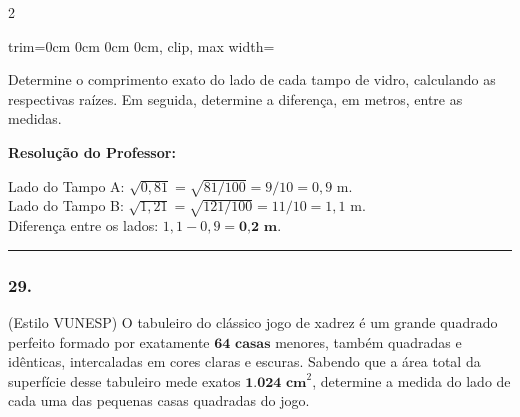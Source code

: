 \begin{multicols*}{2}
\begin{center}
\begin{adjustbox}{trim=0cm 0cm 0cm 0cm, clip, max width=\larguraTikz}
\end{adjustbox}
\end{center}
Determine o comprimento exato do lado de cada tampo de vidro, calculando as respectivas raízes. Em seguida, determine a diferença, em metros, entre as medidas.

\ifgabarito
    \begin{tcolorbox}[colback=CorTitUm!5, colframe=CorTitUm, boxrule=1pt, arc=4pt, left=6pt, right=6pt, top=6pt, bottom=6pt]
    \small\textbf{\textcolor{CorTitUm}{Resolução do Professor:}}\par\vspace{0.1cm}
    \color{CinzaEscuro}
    Lado do Tampo A: $ \sqrt{0,81} = \sqrt{81/100} = 9/10 = 0,9 $ m.\\
    Lado do Tampo B: $ \sqrt{1,21} = \sqrt{121/100} = 11/10 = 1,1 $ m.\\
    Diferença entre os lados: $ 1,1 - 0,9 = \textbf{0,2 m} $.
    \end{tcolorbox}
\fi

\par\vspace{\espacoQuestao}
\noindent\textcolor{CorLinha}{\rule{\linewidth}{0.5pt}} 
\par\vspace{\espacoPreQuestao}
\subsubsection*{29.} (Estilo VUNESP) O tabuleiro do clássico jogo de xadrez é um grande quadrado perfeito formado por exatamente $ \textbf{64 casas} $ menores, também quadradas e idênticas, intercaladas em cores claras e escuras. Sabendo que a área total da superfície desse tabuleiro mede exatos $ \textbf{1.024 cm}^{2} $, determine a medida do lado de cada uma das pequenas casas quadradas do jogo.


\end{multicols*}
